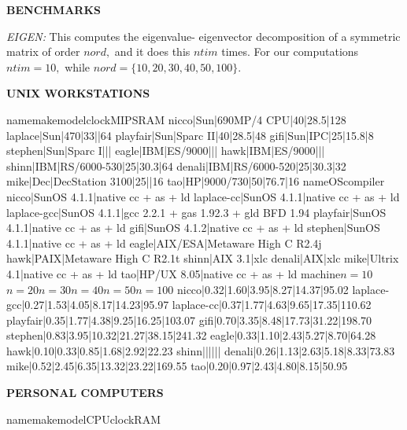 \magnification{}
\parskip 10pt
\parindent 0pt


\centerline{\bf BENCHMARKS}

{\sl EIGEN:} This computes the eigenvalue-
eigenvector decomposition of a symmetric matrix of order $nord,$
and it does this $ntim$ times. For our computations $ntim=10,$
while $nord=\{10,20,30,40,50,100\}.$ 
\vfill\eject
\centerline{\bf UNIX WORKSTATIONS}

\vskip 1cm\begintable
name\vt make\vt model\vt clock\vt MIPS\vt RAM\eltt
nicco|Sun|690MP/4 CPU|40|28.5|128\el
laplace|Sun|470|33||64\el
playfair|Sun|Sparc II|40|28.5|48\el
gifi|Sun|IPC|25|15.8|8\elt
stephen|Sun|Sparc I|||\el
eagle|IBM|ES/9000|||\el
hawk|IBM|ES/9000|||\elt
shinn|IBM|RS/6000-530|25|30.3|64\el
denali|IBM|RS/6000-520|25|30.3|32\elt
mike|Dec|DecStation 3100|25||16\el
tao|HP|9000/730|50|76.7|16\endtable
\vskip 1cm\begintable
name\vt OS\vt compiler\eltt
nicco|SunOS 4.1.1|native cc + as + ld\el
laplace-cc|SunOS 4.1.1|native cc + as + ld\el
laplace-gcc|SunOS 4.1.1|gcc 2.2.1 + gas 1.92.3 + gld BFD 1.94\el
playfair|SunOS 4.1.1|native cc + as + ld\el
gifi|SunOS 4.1.2|native cc + as + ld\elt
stephen|SunOS 4.1.1|native cc + as + ld\elt
eagle|AIX/ESA|Metaware High C R2.4j\el
hawk|PAIX|Metaware High C R2.1t\elt
shinn|AIX 3.1|xlc\el
denali|AIX|xlc\elt
mike|Ultrix 4.1|native cc + as + ld\el
tao|HP/UX 8.05|native cc + as + ld\endtable
\vfill\eject\begintable
machine\vt $n=10$\vt $n=20$\vt $n=30$\vt $n=40$\vt $n=50$\vt $n=100$\eltt
nicco|\hfill 0.32|\hfill 1.60|\hfill 3.95|\hfill 8.27|\hfill 14.37|\hfill 95.02\el
laplace-gcc|\hfill 0.27|\hfill 1.53|\hfill 4.05|\hfill 8.17|\hfill 14.23|\hfill 95.97\el
laplace-cc|\hfill 0.37|\hfill 1.77|\hfill 4.63|\hfill 9.65|\hfill 17.35|\hfill 110.62\el
playfair|\hfill 0.35|\hfill 1.77|\hfill 4.38|\hfill 9.25|\hfill 16.25|\hfill 103.07\el
gifi|\hfill 0.70|\hfill 3.35|\hfill 8.48|\hfill 17.73|\hfill 31.22|\hfill 198.70\el
stephen|\hfill 0.83|\hfill 3.95|\hfill 10.32|\hfill 21.27|\hfill 38.15|\hfill 241.32\elt
eagle|\hfill 0.33|\hfill 1.10|\hfill 2.43|\hfill 5.27|\hfill 8.70|\hfill 64.28\el
hawk|\hfill 0.10|\hfill 0.33|\hfill 0.85|\hfill  1.68|\hfill 2.92|\hfill 22.23\elt
shinn|\hfill|\hfill|\hfill|\hfill|\hfill|\hfill\el
denali|\hfill 0.26|\hfill 1.13|\hfill 2.63|\hfill 5.18|\hfill 8.33|\hfill 73.83\elt
mike|\hfill 0.52|\hfill 2.45|\hfill 6.35|\hfill 13.32|\hfill 23.22|\hfill 169.55\el
tao|\hfill 0.20|\hfill 0.97|\hfill 2.43|\hfill 4.80|\hfill 8.15|\hfill 50.95\endtable
\vfill\eject
\centerline{\bf PERSONAL COMPUTERS}
\vskip 1cm\begintable
name\vt make\vt model\vt CPU\vt clock\vt RAM\eltt
